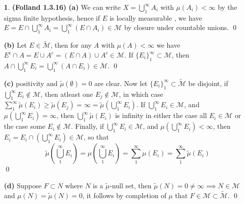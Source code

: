 \documentclass[10.5pt]{article}
\theoremstyle{definition}
\newtheorem{pb}{}
\newcommand{\set}[1]{\{#1\}}
\begin{document}
    \begin{pb} \textbf{(Folland 1.3.16)}
        \textbf{(a)} We can write \(X = \bigcup_1^\infty A_i\) with \(\mu(A_i) < \infty\) by the sigma finite hypothesis, hence if \(E\) is locally measurable , we have \(E = E \cap \bigcup_1^\infty A_i = \bigcup_1^\infty (E \cap A_i) \in \mathcal{M}\) by closure under countable unions. \qed

        \textbf{(b)} Let \(E \in \tilde{\mathcal{M}}\), then for any \(A\) with \(\mu(A) < \infty\) we have \(E^c \cap A = E \cup A^c = (E \cap A) \cup A^c \in \mathcal{M}\). If \(\set{E_i}_1^\infty \subset \mathcal{M}\), then \(A \cap\bigcup_1^\infty E_i = \bigcup_1^\infty (A \cap E_i) \in \mathcal{M}\). \qed

        \textbf{(c)} positivity and \(\tilde{\mu}(\emptyset) = 0\) are clear. Now let \(\set{E_i}_1^\infty \subset \tilde{\mathcal{M}}\) be disjoint, if \(\bigcup_1^\infty E_i \not \in \mathcal{M}\), then atleast one \(E_j \not \in \mathcal{M}\), in which case \(\sum_1^\infty \tilde{\mu}(E_i) \geq \tilde{\mu}(E_j) = \infty = \tilde{\mu}(\bigcup_1^\infty E_i)\). If \(\bigcup_1^\infty E_i \in \mathcal{M}\), and \(\mu(\bigcup_1^\infty E_i) = \infty\), then \(\bigcup_1^\infty \tilde{\mu}(E_i)\) is infinity in either the case all \(E_i \in \mathcal{M}\) or the case some \(E_i \not \in \mathcal{M}\). Finally, if \(\bigcup_1^\infty E_i \in \mathcal{M}\), and \(\mu(\bigcup_1^\infty E_i) < \infty\), then \(E_i = E_i \cap\left(\bigcup_1^\infty E_i \right) \in \mathcal{M}\), so that \[\tilde{\mu}(\bigcup_1^\infty E_i) = \mu(\bigcup_1^\infty E_i) = \sum_1^\infty \mu(E_i) = \sum_1^\infty \tilde{\mu}(E_i)\] \qed

        \textbf{(d)} Suppose \(F \subset N\) where \(N\) is a \(\tilde{\mu}\)-null set, then \(\tilde{\mu}(N) = 0 \neq \infty \implies N \in \mathcal{M}\) and \(\mu(N) = \tilde{\mu}(N) = 0\), it follows by completion of \(\mu\) that \(F \in \mathcal{M} \subset \tilde{\mathcal{M}}\). \qed


\end{pb}
\end{document}
